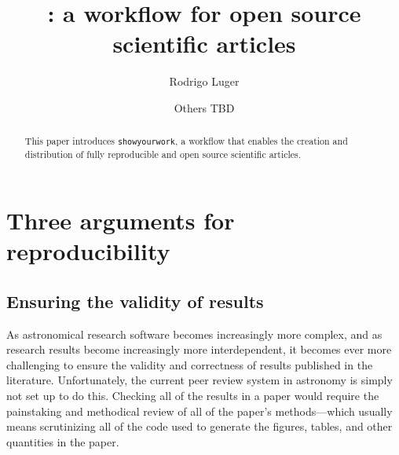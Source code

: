 \documentclass{aastex631}
\newcommand\syw{\texttt{showyourwork}\xspace}
\begin{document}
\title{\showyourwork: a workflow for open source scientific articles}

\author[0000-0002-0296-3826]{Rodrigo Luger}
\author{Others TBD}

%
\begin{abstract}
    This paper introduces \syw, a workflow that enables the creation and distribution of fully reproducible and open source scientific articles.
\end{abstract}

%
\section{Three arguments for reproducibility}
\label{sec:args}

\subsection{Ensuring the validity of results}
\label{sec:args:validity}
As astronomical research software becomes increasingly more complex, and as research results become increasingly more interdependent, it becomes ever more challenging to ensure the validity and correctness of results published in the literature. 
Unfortunately, the current peer review system in astronomy is simply not set up to do this.
Checking all of the results in a paper would require the painstaking and methodical review of all of the paper's methods---which usually means scrutinizing all of the code used to generate the figures, tables, and other quantities in the paper. 
%
\end{document}
